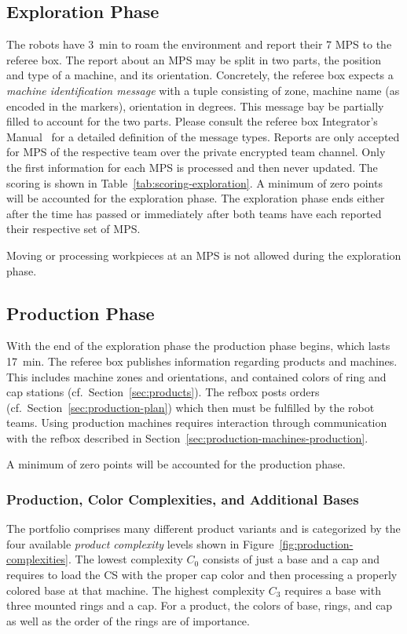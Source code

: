 \documentclass[12pt,twoside]{article}
\newcommand{\refsec}[1]{Section~\ref{#1}}
\newcommand{\reffig}[1]{Figure~\ref{#1}}
\newcommand{\reftab}[1]{Table~\ref{#1}}
\begin{document}
\subsection{Exploration Phase}
\label{sec:exploration-phase}
The robots have \SI{3}{\minute} to roam the environment and report
their 7 MPS to the referee box. The report about an MPS may be split
in two parts, the position and type of a machine, and its orientation.
Concretely, the referee box expects a \emph{machine identification
  message} with a tuple consisting of zone, machine name (as encoded
in the markers), orientation in degrees. This message bay be partially
filled to account for the two parts. Please consult the referee box
Integrator's Manual~\cite{RefBoxIntManual} for a detailed definition
of the message types. Reports are only accepted for MPS of the
respective team over the private encrypted team channel. Only the
first information for each MPS is processed and then never
updated. The scoring is shown in \reftab{tab:scoring-exploration}. A
minimum of zero points will be accounted for the exploration
phase. The exploration phase ends either after the time has passed or
immediately after both teams have each reported their respective set
of MPS\@.

Moving or processing workpieces at an MPS is not allowed during the
exploration phase.

\subsection{Production Phase}
\label{sec:production-phase}
With the end of the exploration phase the production phase begins,
which lasts \SI{17}{\minute}. The referee box publishes information
regarding products and machines. This includes machine zones and
orientations, and contained colors of ring and cap stations
(cf.~\refsec{sec:products}). The refbox posts orders
(cf.~\refsec{sec:production-plan}) which then must be fulfilled by the
robot teams. Using production machines requires interaction through
communication with the refbox described in
\refsec{sec:production-machines-production}.

A minimum of zero points will be accounted for the production phase.

\subsubsection{Production, Color Complexities, and Additional Bases}
\label{sec:production-complexities}
The portfolio comprises many different product variants and is
categorized by the four available \emph{product complexity} levels
shown in \reffig{fig:production-complexities}. The lowest complexity
$C_0$ consists of just a base and a cap and requires to load the CS
with the proper cap color and then processing a properly colored base
at that machine. The highest complexity $C_3$ requires a base with
three mounted rings and a cap. For a product, the colors of base,
rings, and cap as well as the order of the rings are of importance.
\end{document}
